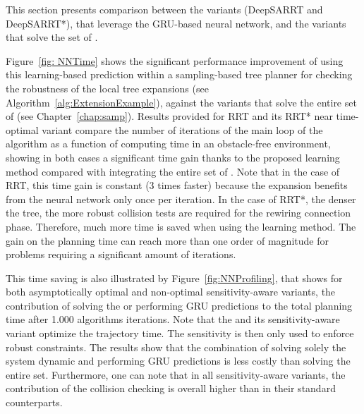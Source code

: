 This section presents comparison between the  variants (DeepSARRT and DeepSARRT*), that leverage the GRU-based neural network, and the  variants that solve the set of .

Figure~\ref{fig: NNTime} shows the significant performance improvement of using this learning-based prediction within a sampling-based tree planner for checking the robustness of the local tree expansions (see Algorithm~\ref{alg:ExtensionExample}), against the  variants that solve the entire set of  (see Chapter~\ref{chap:samp}).  
Results provided for RRT and its RRT* near time-optimal variant compare the number of iterations of the main loop of the algorithm as a function of computing time in an obstacle-free environment, showing in both cases a significant time gain thanks to the proposed learning method compared with integrating the entire set of .
Note that in the case of RRT, this time gain is constant ($3$ times faster) because the expansion benefits from the neural network only once per iteration.
In the case of RRT*, the denser the tree, the more robust collision tests are required for the rewiring connection phase. 
Therefore, much more time is saved when using the learning method. 
The gain on the planning time can reach more than one order of magnitude for problems requiring a significant amount of iterations.

This time saving is also illustrated by Figure~\ref{fig:NNProfiling}, that shows for both asymptotically optimal and non-optimal sensitivity-aware variants, the contribution of solving the  or performing GRU predictions to the total planning time after 1.000 algorithms iterations.
Note that the  and its sensitivity-aware variant optimize the trajectory time.
The sensitivity is then only used to enforce robust constraints.
The results show that the combination of solving solely the system dynamic and performing GRU predictions is less costly than solving the entire  set.
Furthermore, one can note that in all sensitivity-aware variants, the contribution of the collision checking is overall higher than in their standard counterparts.

